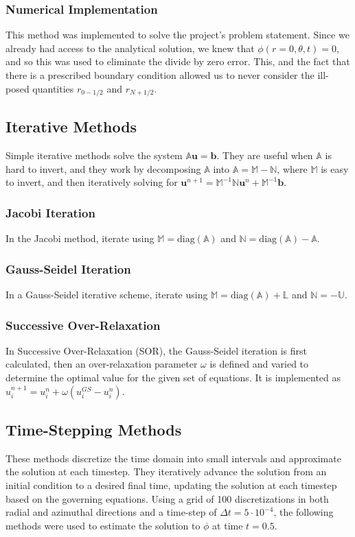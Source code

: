 \documentclass{homework}
\begin{document}
\subsubsection{\textbf{Numerical Implementation}}
This method was implemented to solve the project's problem statement. Since we already had access to the analytical solution, we knew that $\phi(r=0, \theta, t) = 0$, and so this was used to eliminate the divide by zero error. This, and the fact that there is a prescribed boundary condition allowed us to never consider the ill-posed quantities $r_{0-1/2}$ and $r_{N+1/2}$.


\subsection{\textbf{Iterative Methods}}
Simple iterative methods solve the system $\mathbb{A} \mathbf{u} = \mathbf{b}$. They are useful when $\mathbb{A}$ is hard to invert, and they work by decomposing $\mathbb{A}$ into $\mathbb{A} = \mathbb{M} - \mathbb{N}$, where $\mathbb{M}$ is easy to invert, and then iteratively solving for $\mathbf{u}^{n+1} = \mathbb{M}^{-1} \mathbb{N} \mathbf{u}^n + \mathbb{M}^{-1} \mathbf{b}$.

\subsubsection{\textbf{Jacobi Iteration}}
In the Jacobi method, iterate using $\mathbb{M} = \text{diag}(\mathbb{A})$ and $\mathbb{N} = \text{diag}(\mathbb{A}) - \mathbb{A}$.

\subsubsection{\textbf{Gauss-Seidel Iteration}}
In a Gauss-Seidel iterative scheme, iterate using $\mathbb{M} = \text{diag}(\mathbb{A}) + \mathbb{L}$ and $\mathbb{N} = - \mathbb{U}$.

\subsubsection{\textbf{Successive Over-Relaxation}}
In Successive Over-Relaxation (SOR), the Gauss-Seidel iteration is first calculated, then an over-relaxation parameter $\omega$ is defined and varied to determine the optimal value for the given set of equations. It is implemented as $u_i^{n+1} = u_i^n + \omega (u_i^{GS} - u_i^n)$.

\subsection{\textbf{Time-Stepping Methods}}
\noindent These methods discretize the time domain into small intervals and approximate the solution at each timestep. They iteratively advance the solution from an initial condition to a desired final time, updating the solution at each timestep based on the governing equations. Using a grid of 100 discretizations in both radial and azimuthal directions and a time-step of $\Delta t = 5\cdot 10^{-4}$, the following methods were used to estimate the solution to $\phi$ at time $t = 0.5$.
\end{document}
